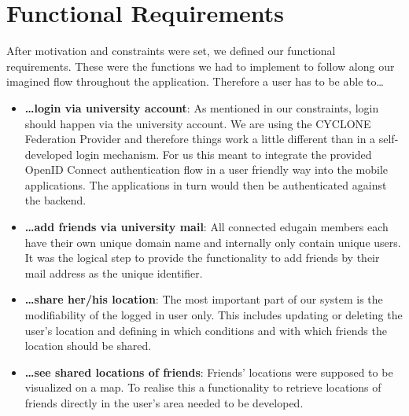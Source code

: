 \vspace{0.5cm}

\section{Functional Requirements}

After motivation and constraints were set, we defined our functional requirements. These were the functions we had to implement to follow along our imagined flow throughout the application. Therefore a user has to be able to\ldots

\begin{itemize}
    \item \textbf{\ldots login via university account}: As mentioned in our constraints, login should happen via the university account. We are using the CYCLONE Federation Provider and therefore things work a little different than in a self-developed login mechanism. For us this meant to integrate the provided OpenID Connect authentication flow in a user friendly way into the mobile applications. The applications in turn would then be authenticated against the backend.
    \item \textbf{\ldots add friends via university mail}: All connected edugain members each have their own unique domain name and internally only contain unique users. It was the logical step to provide the functionality to add friends by their mail address as the unique identifier.
    \item \textbf{\ldots share her/his location}: The most important part of our system is the modifiability of the logged in user only. This includes updating or deleting the user's location and defining in which conditions and with which friends the location should be shared.
    \item \textbf{\ldots see shared locations of friends}: Friends' locations were supposed to be visualized on a map. To realise this a functionality to retrieve locations of friends directly in the user's area needed to be developed.
\end{itemize}